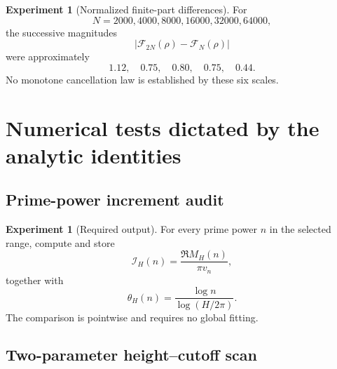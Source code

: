 \documentclass[11pt]{amsart}
\numberwithin{equation}{section}
\theoremstyle{plain}
\theoremstyle{definition}
\newtheorem{experiment}[theorem]{Experiment}
\theoremstyle{remark}
\newcommand{\1}{\mathbf{1}}
\begin{document}
\begin{experiment}[Normalized finite-part differences]
\label{exp:numerical_finite_part_scale_scan_detailed}
For
\begin{equation}
N=2000,4000,8000,16000,32000,64000,
\label{eq:numerical_finite_part_N_values}
\end{equation}
the successive magnitudes
\begin{equation}
|\mathcal F_{2N}(\rho)-\mathcal F_N(\rho)|
\label{eq:numerical_finite_part_difference_definition}
\end{equation}
were approximately
\begin{equation}
1.12,
\quad0.75,
\quad0.80,
\quad0.75,
\quad0.44.
\label{eq:numerical_finite_part_difference_values}
\end{equation}
No monotone cancellation law is established by these six scales.
\end{experiment}

\section{Numerical tests dictated by the analytic identities}
\label{sec:numerical_next_tests}

\subsection{Prime-power increment audit}
\label{subsec:numerical_increment_audit}

\begin{experiment}[Required output]
\label{exp:required_increment_output}
For every prime power $n$ in the selected range, compute and store
\begin{equation}
\mathcal I_H(n)
=
\frac{\Re M_H(n)}{\pi v_n},
\label{eq:numerical_increment_output}
\end{equation}
together with
\begin{equation}
\theta_H(n)
=
\frac{\log n}{\log(H/2\pi)}.
\label{eq:numerical_theta_output}
\end{equation}
The comparison is pointwise and requires no global fitting.
\end{experiment}

\subsection{Two-parameter height--cutoff scan}
\label{subsec:numerical_two_parameter_scan}
\end{document}
